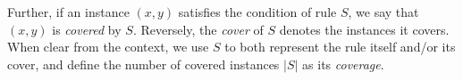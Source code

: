 Further, if an instance $(x,y)$ satisfies the condition of rule $S$, we say that $(x,y)$ is \emph{covered} by $S$. Reversely, the \emph{cover} of $S$ denotes the instances it covers. When clear from the context, we use $S$ to both represent the rule itself and/or its cover, and define the number of covered instances $|S|$ as its \emph{coverage}. 




